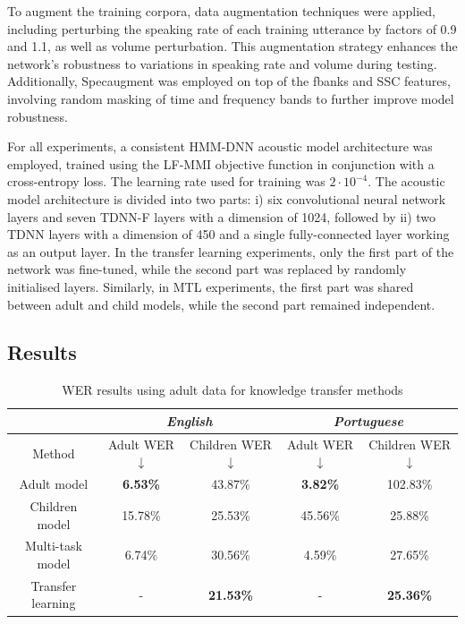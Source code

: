 To augment the training corpora, data augmentation techniques were applied, including perturbing the speaking rate of each training utterance by factors of 0.9 and 1.1, as well as volume perturbation. This augmentation strategy enhances the network's robustness to variations in speaking rate and volume during testing. Additionally, Specaugment \cite{specaugment} was employed on top of the \ac{fbanks} and \ac{SSC} features, involving random masking of time and frequency bands to further improve model robustness.

For all experiments, a consistent \ac{HMM-DNN} acoustic model architecture was employed, trained using the \ac{LF-MMI} objective function in conjunction with a cross-entropy loss. The learning rate used for training was $2 \cdot 10^{-4}$. The acoustic model architecture is divided into two parts: i) six convolutional neural network layers and seven \ac{TDNN-F} layers with a dimension of 1024, followed by ii) two \ac{TDNN} layers with a dimension of 450 and a single fully-connected layer working as an output layer. In the transfer learning experiments, only the first part of the network was fine-tuned, while the second part was replaced by randomly initialised layers. Similarly, in \ac{MTL} experiments, the first part was shared between adult and child models, while the second part remained independent. 

\subsection{Results}

\begin{table}[h]
    \centering
    \begin{tabular}{c|cc|cc}
    \hline
                      & \multicolumn{2}{c}{\textit{English}} & \multicolumn{2}{|c}{\textit{Portuguese}} \\ \hline
    Method            & Adult WER  $\downarrow$  & Children WER $\downarrow$  & Adult WER  $\downarrow$   & Children WER  $\downarrow$   \\ \hline
    Adult model       & \textbf{6.53\%}      & 43.87\%       & \textbf{3.82\%}       & 102.83\%        \\
    Children model    & 15.78\%     & 25.53\%       & 45.56\%      & 25.88\%         \\
    Multi-task model  & 6.74\%      & 30.56\%       & 4.59\%       & 27.65\%         \\
    Transfer learning & -           & \textbf{21.53\%}       & -            & \textbf{25.36\%}         \\ \hline
    \end{tabular}
    \caption{WER results using adult data for knowledge transfer methods}
\label{tab:res_exp1}

    \end{table}

